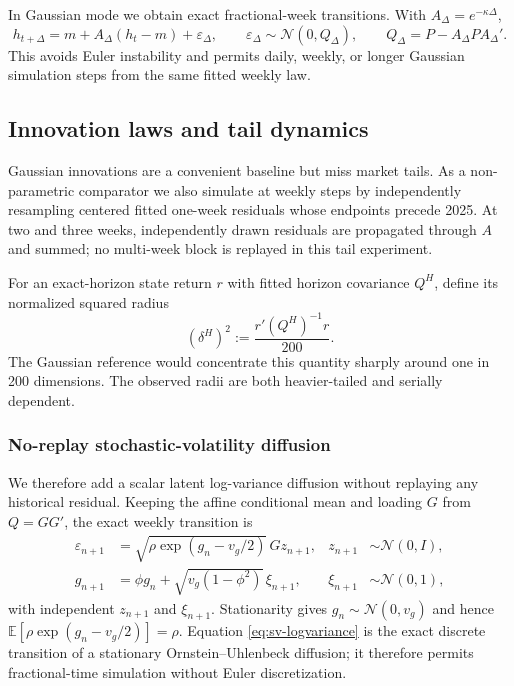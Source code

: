 \documentclass[11pt,a4paper]{article}
\newcommand{\E}{\mathbb{E}}
\begin{document}
In Gaussian mode we obtain exact fractional-week transitions.  With
$A_\Delta=e^{-\kappa\Delta}$,
\begin{equation}
  h_{t+\Delta}=m+A_\Delta(h_t-m)+\varepsilon_\Delta,
  \qquad
  \varepsilon_\Delta\sim\mathcal N(0,Q_\Delta),
  \qquad
  Q_\Delta=P-A_\Delta P A_\Delta'.
  \label{eq:exact-transition}
\end{equation}
This avoids Euler instability and permits daily, weekly, or longer Gaussian
simulation steps from the same fitted weekly law.

\subsection{Innovation laws and tail dynamics}

Gaussian innovations are a convenient baseline but miss market tails.  As a
non-parametric comparator we also simulate at weekly steps by independently
resampling centered fitted one-week residuals whose endpoints precede 2025.
At two and three weeks, independently drawn residuals are propagated through
$A$ and summed; no multi-week block is replayed in this tail experiment.

For an exact-horizon state return $r$ with fitted horizon covariance $Q^H$,
define its normalized squared radius
\begin{equation}
  (\delta^H)^2:=\frac{r'(Q^H)^{-1}r}{200}.
  \label{eq:radius}
\end{equation}
The Gaussian reference would concentrate this quantity sharply around one in
200 dimensions.  The observed radii are both heavier-tailed and serially
dependent.

\subsubsection{No-replay stochastic-volatility diffusion}

We therefore add a scalar latent log-variance diffusion without replaying any
historical residual.  Keeping the affine conditional mean and loading $G$
from $Q=GG'$, the exact weekly transition is
\begin{align}
  \varepsilon_{n+1}
    &=\sqrt{\rho\exp(g_n-v_g/2)}\,Gz_{n+1},
      &z_{n+1}&\sim\mathcal N(0,I),\label{eq:sv-innovation}\\
  g_{n+1}
    &=\phi g_n+\sqrt{v_g(1-\phi^2)}\,\xi_{n+1},
      &\xi_{n+1}&\sim\mathcal N(0,1),\label{eq:sv-logvariance}
\end{align}
with independent $z_{n+1}$ and $\xi_{n+1}$.  Stationarity gives
$g_n\sim\mathcal N(0,v_g)$ and hence
$\E[\rho\exp(g_n-v_g/2)]=\rho$.  Equation
\eqref{eq:sv-logvariance} is the exact discrete transition of a stationary
Ornstein--Uhlenbeck diffusion; it therefore permits fractional-time simulation
without Euler discretization.
\end{document}
